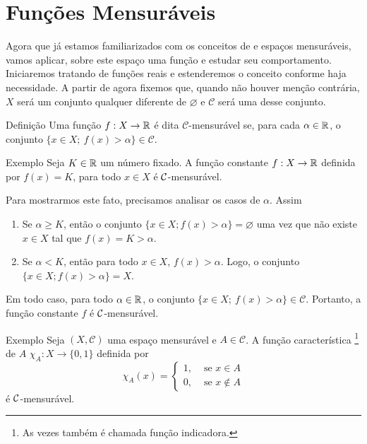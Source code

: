 \section{Funções Mensuráveis}
Agora que já estamos familiarizados com os conceitos de \sigal e espaços mensuráveis, vamos aplicar, sobre este espaço uma função e estudar seu comportamento.
Iniciaremos tratando de funções reais e estenderemos o conceito conforme haja necessidade.
A partir de agora fixemos que, quando não houver menção contrária, $X$ será um conjunto qualquer diferente de $\varnothing$ e $\mathcal{C}$ será uma \sigal desse conjunto. 

\begin{env}{Definição}
	\label{def:mensurabilidade-funções-reais}
    Uma função $f: X \to \mathbb{R} $ é dita $\mathcal{C}$-mensurável se, para cada $\alpha \in \mathbb{R}$, o conjunto $\{x \in X;\ f(x) > \alpha\} \in \mathcal{C}$.
    \vspace{-0.2cm}
\end{env}
\begin{env}{Exemplo}
\label{ex:funcao-constante}
	Seja $K \in \mathbb{R}$ um número fixado. 
	A função constante $f: X \to \mathbb{R}$ definida por $f(x) = K$, para todo $x \in X$ é $\operatorname{\mathcal{C}}$-mensurável.
	\vspace{-0.2cm}
\end{env}

Para mostrarmos este fato, precisamos analisar os casos de $\alpha$.
Assim
	\begin{enumerate}[label*= (\Roman*)]
		\item Se $\alpha \geq K$, então o conjunto $\{x \in X; f(x) > \alpha\} = \varnothing$ uma vez que não existe $x \in X$ tal que $f(x)= K > \alpha$.
		\item Se $\alpha < K$, então para todo $x \in X$, $f(x) > \alpha$.
		Logo, o conjunto $\{x \in X; f(x) > \alpha\} = X$.
	\end{enumerate}
Em todo caso, para todo $\alpha \in \mathbb{R}$, o conjunto  $\{x \in X;\ f(x) > \alpha\} \in \mathcal{C}$.
Portanto, a função constante $f$ é $\operatorname{\mathcal{C}}$-mensurável.
\begin{env}{Exemplo}
    Seja $(X, \mathcal{C})$ uma espaço mensurável e $A \in \mathcal{C}$.
    A função característica \footnote{As vezes também é chamada  função indicadora.} de $A$ 
    $\chi_A: X \to \{0,1\}$ definida por 
    $$\chi_A(x) =\left\{\begin{array}{cc}
         1, & \textrm{\ se \ } x \in A \\
         0, & \textrm{\ se \ } x \notin A
    \end{array}\right.
    $$
    é $\operatorname{\mathcal{C}}$-mensurável.
    \vspace{-0.2cm}
\end{env}

